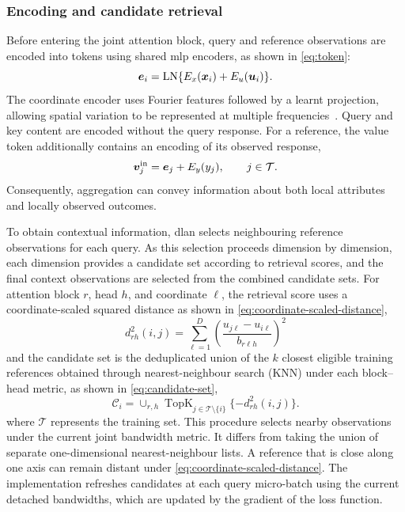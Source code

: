 \documentclass[]{interact}
\newcommand{\train}{\mathcal{T}}
\newcommand{\cand}{\mathcal{C}}
\newcommand{\lnorm}{\operatorname{LN}}
\newcommand{\DLAN}{\gls{dlan}\xspace}
\begin{document}
\subsubsection{Encoding and candidate retrieval}

Before entering the joint attention block, query and reference observations are encoded into tokens using shared \gls{mlp} encoders, as shown in \autoref{eq:token}:
\begin{equation}\label{eq:token}
 \ve_i=\lnorm\{E_x(\vx_i)+E_u(\vu_i)\}.
\end{equation}
The coordinate encoder uses Fourier features followed by a learnt projection,
allowing spatial variation to be represented at multiple frequencies~\citep{TancikSrinivasan-2020}.
Query and key content are encoded without the query response.
For a reference, the value token additionally contains an encoding of its observed response,
\begin{equation}
 \bv^{\rm in}_j=\ve_j+E_y(y_j),\qquad j\in\train.
\end{equation}
Consequently, aggregation can convey information about both local attributes and locally observed outcomes.

To obtain contextual information, \DLAN selects neighbouring reference observations for each query.
As this selection proceeds dimension by dimension, each dimension provides a candidate set according to retrieval scores,
and the final context observations are selected from the combined candidate sets.
For attention block $r$, head $h$, and coordinate $\ell$, the retrieval score uses a coordinate-scaled squared distance as shown in \autoref{eq:coordinate-scaled-distance},
\begin{equation}\label{eq:coordinate-scaled-distance}
  d_{rh}^2(i,j) = \sum_{\ell=1}^{D} \left( \frac{u_{j\ell} - u_{i\ell}}{b_{r\ell h}} \right)^2
\end{equation}
and the candidate set is the deduplicated union of the $k$ closest eligible training references obtained through nearest-neighbour search (KNN) under each block--head metric, as shown in \autoref{eq:candidate-set},
\begin{equation}\label{eq:candidate-set}
  \cand_i = \cup_{r,h} \operatorname{TopK}_{j \in \train\setminus\{i\}} \{-d_{rh}^2(i,j)\}.
\end{equation}
where $\train$ represents the training set.
This procedure selects nearby observations under the current joint bandwidth metric.
It differs from taking the union of separate one-dimensional nearest-neighbour lists.
A reference that is close along one axis can remain distant under \autoref{eq:coordinate-scaled-distance}.
The implementation refreshes candidates at each query micro-batch using the current detached bandwidths, which are updated by the gradient of the loss function.
\end{document}

